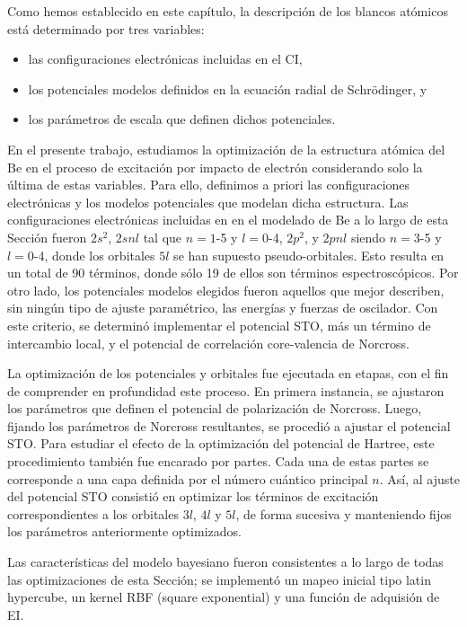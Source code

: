 Como hemos establecido en este capítulo, la descripción de los blancos 
atómicos está determinado por tres variables:
\begin{itemize}
\item las configuraciones electrónicas incluidas en el CI,
\item los potenciales modelos definidos en la ecuación radial de 
Schr\"odinger, y
\item los parámetros de escala que definen dichos potenciales.
\end{itemize}
En el presente trabajo, estudiamos la optimización de la estructura 
atómica del Be en el proceso de excitación por impacto de electrón 
considerando solo la última de estas variables. Para ello, definimos a 
priori las configuraciones electrónicas y los modelos potenciales que
modelan dicha estructura. Las configuraciones electrónicas incluidas en
en el modelado de Be a lo largo de esta Sección fueron $2s^2$, $2snl$ 
tal que $n=1$-5 y $l=0$-4, $2p^2$, y $2pnl$ siendo $n=3$-5 y $l=0$-4, 
donde los orbitales $5l$ se han supuesto pseudo-orbitales. Esto resulta 
en un total de 90 términos, donde sólo 19 de ellos son términos 
espectroscópicos. Por otro lado, los potenciales modelos elegidos fueron 
aquellos que mejor describen, sin ningún tipo de ajuste paramétrico, las 
energías y fuerzas de oscilador. Con este criterio, se determinó 
implementar el potencial STO, más un término de intercambio local, y el 
potencial de correlación core-valencia de Norcross.

La optimización de los potenciales y orbitales fue ejecutada en etapas, 
con el fin de comprender en profundidad este proceso. En primera 
instancia, se ajustaron los parámetros que definen el potencial de 
polarización de Norcross. Luego, fijando los parámetros de Norcross 
resultantes, se procedió a ajustar el potencial STO. Para estudiar el 
efecto de la optimización del potencial de Hartree, este procedimiento 
también fue encarado por partes. Cada una de estas partes se corresponde 
a una capa definida por el número cuántico principal $n$. Así, al ajuste 
del potencial STO consistió en optimizar los términos de excitación 
correspondientes a los orbitales $3l$, $4l$ y $5l$, de forma sucesiva y 
manteniendo fijos los parámetros anteriormente optimizados.

Las características del modelo bayesiano fueron consistentes a lo largo 
de todas las optimizaciones de esta Sección; se implementó un mapeo 
inicial tipo latin hypercube, un kernel RBF (square exponential) y una 
función de adquisión de EI. 

